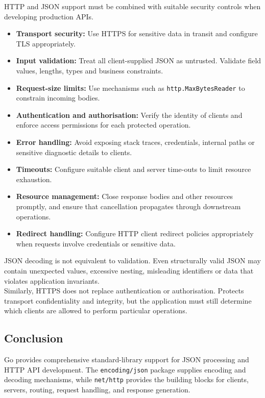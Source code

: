 HTTP and JSON support must be combined with suitable security controls when developing production APIs.

\begin{itemize}
    \item \textbf{Transport security:} Use HTTPS for sensitive data in transit and configure TLS appropriately.
    \item \textbf{Input validation:} Treat all client-supplied JSON as untrusted. Validate field values, lengths, types and business constraints.
    \item \textbf{Request-size limits:} Use mechanisms such as \texttt{http.MaxBytesReader} to constrain incoming bodies.
    \item \textbf{Authentication and authorisation:} Verify the identity of clients and enforce access permissions for each protected operation.
    \item \textbf{Error handling:} Avoid exposing stack traces, credentials, internal paths or sensitive diagnostic details to clients.
    \item \textbf{Timeouts:} Configure suitable client and server time-outs to limit resource exhaustion.
    \item \textbf{Resource management:} Close response bodies and other resources promptly, and ensure that cancellation propagates through downstream operations.
    \item \textbf{Redirect handling:} Configure HTTP client redirect policies appropriately when requests involve credentials or sensitive data.
\end{itemize}

JSON decoding is not equivalent to validation. Even structurally valid JSON may contain unexpected values, excessive nesting, misleading identifiers or data that violates application invariants.\\

Similarly, HTTPS does not replace authentication or authorisation. Protects transport confidentiality and integrity, but the application must still determine which clients are allowed to perform particular operations.\\

\subsection{Conclusion}

Go provides comprehensive standard-library support for JSON processing and HTTP API development. The \texttt{encoding/json} package supplies encoding and decoding mechanisms, while \texttt{net/http} provides the building blocks for clients, servers, routing, request handling, and response generation.\\

